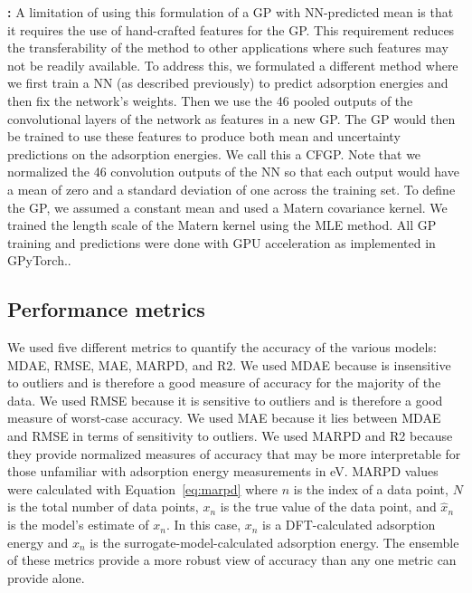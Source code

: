 \documentclass[]{achemso}
\begin{document}
\textbf{:}
A limitation of using this formulation of a \gls{GP} with \gls{NN}-predicted mean is that it requires the use of hand-crafted features for the \gls{GP}.
This requirement reduces the transferability of the method to other applications where such features may not be readily available.
To address this, we formulated a different method where we first train a \gls{NN} (as described previously) to predict adsorption energies and then fix the network's weights.
Then we use the 46 pooled outputs of the convolutional layers of the network as features in a new \gls{GP}.
The \gls{GP} would then be trained to use these features to produce both mean and uncertainty predictions on the adsorption energies.
We call this a \gls{CFGP}.
Note that we normalized the 46 convolution outputs of the \gls{NN} so that each output would have a mean of zero and a standard deviation of one across the training set.
To define the \gls{GP}, we assumed a constant mean and used a Matern covariance kernel.
We trained the length scale of the Matern kernel using the \gls{MLE} method.
All \gls{GP} training and predictions were done with GPU acceleration as implemented in GPyTorch.\cite{Gardner2018}.


\subsection{Performance metrics}

We used five different metrics to quantify the accuracy of the various models:  \gls{MDAE}, \gls{RMSE}, \gls{MAE}, \gls{MARPD}, and \gls{R2}.
We used \gls{MDAE} because is insensitive to outliers and is therefore a good measure of accuracy for the majority of the data.
We used \gls{RMSE} because it is sensitive to outliers and is therefore a good measure of worst-case accuracy.
We used \gls{MAE} because it lies between \gls{MDAE} and \gls{RMSE} in terms of sensitivity to outliers.
We used \gls{MARPD} and \gls{R2} because they provide normalized measures of accuracy that may be more interpretable for those unfamiliar with adsorption energy measurements in \gls{eV}.
\gls{MARPD} values were calculated with Equation~\ref{eq:marpd} where $n$ is the index of a data point, $N$ is the total number of data points, $x_n$ is the true value of the data point, and $\hat{x}_n$ is the model's estimate of $x_n$.
In this case, $x_n$ is a DFT-calculated adsorption energy and $\hat{x}_n$ is the surrogate-model-calculated adsorption energy.
The ensemble of these metrics provide a more robust view of accuracy than any one metric can provide alone.
\end{document}
